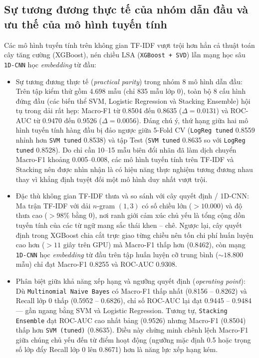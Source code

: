\subsection{Sự tương đương thực tế của nhóm dẫn đầu và ưu thế của mô hình tuyến tính}
Các mô hình tuyến tính trên không gian TF-IDF vượt trội hơn hẳn cả thuật toán cây tăng cường (XGBoost), nén chiều LSA (\texttt{XGBoost + SVD}) lẫn mạng học sâu \texttt{1D-CNN} học \textit{embedding} từ đầu:
\begin{itemize}
    \item Sự tương đương thực tế (\textit{practical parity}) trong nhóm 8 mô hình dẫn đầu: Trên tập kiểm thử gồm 4.698 mẫu (chỉ 835 mẫu lớp 0), toàn bộ 8 cấu hình đứng đầu (các biến thể SVM, Logistic Regression và Stacking Ensemble) hội tụ trong dải rất hẹp: Macro-F1 từ 0.8504 đến 0.8635 ($\Delta = 0.0131$) và ROC-AUC từ 0.9470 đến 0.9526 ($\Delta = 0.0056$). Đáng chú ý, thứ hạng giữa hai mô hình tuyến tính hàng đầu bị đảo ngược giữa 5-Fold CV (\texttt{LogReg tuned} 0.8559 nhỉnh hơn \texttt{SVM tuned} 0.8538) và tập Test (\texttt{SVM tuned} 0.8635 so với \texttt{LogReg tuned} 0.8528). Do chỉ cần 10--15 mẫu biên đổi nhãn đã làm dịch chuyển Macro-F1 khoảng 0.005--0.008, các mô hình tuyến tính trên TF-IDF và Stacking nên được nhìn nhận là có hiệu năng thực nghiệm tương đương nhau thay vì khẳng định tuyệt đối một mô hình duy nhất vượt trội.
    \item Đặc thù không gian TF-IDF thưa và so sánh với cây quyết định / 1D-CNN: Ma trận TF-IDF với dải $n$-gram $(1, 3)$ có số chiều lớn ($> 10.000$) và độ thưa cao ($> 98\%$ bằng 0), nơi ranh giới cảm xúc chủ yếu là tổng cộng dồn tuyến tính của các từ ngữ mang sắc thái khen -- chê. Ngược lại, cây quyết định trong XGBoost chia cắt trực giao từng chiều nên tốn chi phí huấn luyện cao hơn ($> 11$ giây trên GPU) mà Macro-F1 thấp hơn (0.8462), còn mạng \texttt{1D-CNN} học \textit{embedding} từ đầu trên tập huấn luyện cỡ trung bình ($\sim 18.800$ mẫu) chỉ đạt Macro-F1 0.8255 và ROC-AUC 0.9308.
    \item Phân biệt giữa khả năng xếp hạng và ngưỡng quyết định (\textit{operating point}): Dù \texttt{Multinomial Naive Bayes} có Macro-F1 thấp nhất (0.8156 -- 0.8262) và Recall lớp 0 thấp (0.5952 -- 0.6826), chỉ số ROC-AUC lại đạt 0.9445 -- 0.9484 — gần ngang bằng SVM và Logistic Regression. Tương tự, \texttt{Stacking Ensemble} đạt ROC-AUC cao nhất bảng (0.9526) nhưng Macro-F1 (0.8504) thấp hơn \texttt{SVM (tuned)} (0.8635). Điều này chứng minh chênh lệch Macro-F1 giữa chúng chủ yếu đến từ điểm hoạt động (ngưỡng mặc định 0.5 hoặc trọng số lớp đẩy Recall lớp 0 lên 0.8671) hơn là năng lực xếp hạng kém.
\end{itemize}

